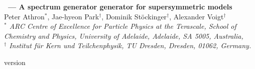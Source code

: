 \documentclass[a4paper,11pt]{article}
\begin{document}
\begin{titlepage}
  \vspace*{55mm}
  \begin{center}
    {\Large\bf \FlexibleSUSY\ --- A spectrum generator generator for
      supersymmetric models}
    \\[8mm]
    Peter Athron$^{*}$,
    Jae-hyeon Park$^{\dagger}$,
    Dominik St\"ockinger$^{\dagger}$,
    Alexander Voigt$^{\dagger}$
    \\[3mm]
    {\small\it $^*$ ARC Centre of Excellence for Particle Physics at
      the Terascale, School of Chemistry and Physics, University of
      Adelaide, Adelaide, SA 5005, Australia,
      \\[2mm]
      \small\it $^\dagger$ Institut f\"ur Kern und Teilchenphysik, TU
      Dresden, Dresden, 01062, Germany.\\[2mm]}
  \end{center}
  \vspace*{0.75cm}
  \begin{abstract}
    We present a new spectrum generator generator for supersymmetric
    models with modularity and speed in mind.
  \end{abstract}
  \vfill
  \begin{flushleft}
    \FlexibleSUSY version \FlexibleSUSYVersion
  \end{flushleft}
\end{titlepage}

\tableofcontents
\clearpage




\end{document}
